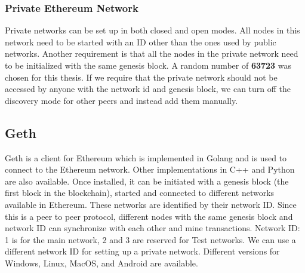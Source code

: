 \documentclass[11pt,openright]{report}
\begin{document}
\subsubsection{Private Ethereum Network}
Private networks can be set up in both closed and open modes. All nodes in this network need to be started with an ID other than the ones used by public networks. Another requirement is that all the nodes in the private network need to be initialized with the same genesis block. A random number of \textbf{63723} was chosen for this thesis. If we require that the private network should not be accessed by anyone with the network id and genesis block, we can turn off the discovery mode for other peers and instead add them manually.

\subsection{Geth}
Geth is a client for Ethereum which is implemented in Golang and is used to connect to the Ethereum network. Other implementations in C++ and Python are also available. Once installed, it can be initiated with a genesis block (the first block in the blockchain), started and connected to different networks available in Ethereum. These networks are identified by their network ID. Since this is a peer to peer protocol, different nodes with the same genesis block and network ID can synchronize with each other and mine transactions. Network ID: 1 is for the main network, 2 and 3 are reserved for Test networks. We can use a different network ID for setting up a private network. Different versions for Windows, Linux, MacOS, and Android are available.
\end{document}
